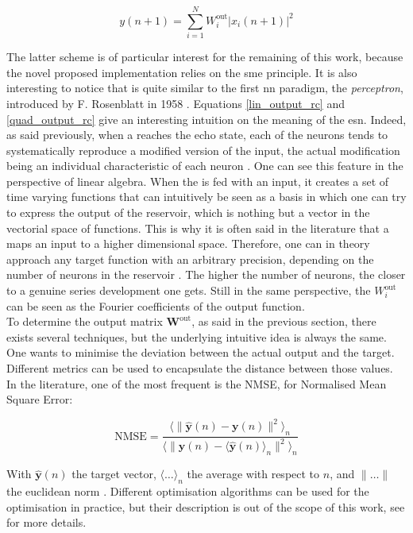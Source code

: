 \begin{equation}
	y(n+1) = \sum_{i=1}^{N} W^{\text{out}}_i |x_i (n+1)|^2
	\label{quad_output_rc}
\end{equation}

The latter scheme is of particular interest for the remaining of this work, because the novel proposed implementation relies on the sme principle. It is also interesting to notice that is quite similar to the first \gls{nn} paradigm, the \emph{perceptron}, introduced by F. Rosenblatt in 1958 \cite{Rosenblatt58theperceptron}. Equations \eqref{lin_output_rc} and \eqref{quad_output_rc} give an interesting intuition on the meaning of the \gls{esn}. Indeed, as said previously, when a \rc reaches the echo state, each of the neurons tends to systematically reproduce a modified version of the input, the actual modification being an individual characteristic of each neuron \cite{Jaeger2004}. One can see this feature in the perspective of linear algebra. When the \rcer is fed with an input, it creates a set of time varying functions that can intuitively be seen as a basis in which one can try to express the output of the reservoir, which is nothing but a vector in the vectorial space of functions. This is why it is often said in the literature that a \rcer maps an input to a higher dimensional space. Therefore, one can in theory approach any target function with an arbitrary precision, depending on the number of neurons in the reservoir \cite{Jaeger2004}. The higher the number of neurons, the closer to a genuine series development one gets. Still in the same perspective, the $W^{\text{out}}_i$ can be seen as the Fourier coefficients of the output function.\\

To determine the output matrix $\mathbf{W}^{\text{out}}$, as said in the previous section, there exists several techniques, but the underlying intuitive idea is always the same. One wants to minimise the deviation between the actual output and the target. Different metrics can be used to encapsulate the distance between those values. In the literature, one of the most frequent is the NMSE, for Normalised Mean Square Error:

\begin{equation}
	\text{NMSE} = \frac{\langle \| \hat{\mathbf{y}}(n) - \mathbf{y}(n)\|^2 \rangle _n}{\langle \| \hat{\mathbf{y}}(n) - \langle \hat{\mathbf{y}}(n) \rangle _n \|^2 \rangle _n}
\end{equation}

With $\hat{\mathbf{y}}(n)$ the target vector, $\langle \dots \rangle _n$ the average with respect to $n$, and $\| \dots \|$ the euclidean norm \cite{Duport2016}. Different optimisation algorithms can be used for the optimisation in practice, but their description is out of the scope of this work, see \cite{Lukoeviius2009} for more details.


